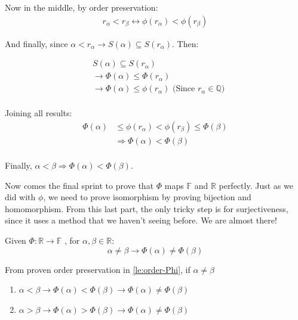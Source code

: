 \begin{bookproof}
Now in the middle, by order preservation:
\begin{align*}
r_\alpha < r_\beta \leftrightarrow \phi(r_\alpha) < \phi(r_\beta)
\end{align*}

And finally, since $\alpha < r_\alpha \rightarrow S(\alpha) \subseteq S(r_\alpha)$. Then:

\begin{align*}
&S(\alpha) \subseteq S(r_\alpha) \\
&\rightarrow \Phi(\alpha) \leq \Phi(r_\alpha) \\
&\rightarrow \Phi(\alpha) \leq \phi(r_\alpha) \text{ (Since $r_\alpha \in \mathbb{Q}$)} \\
\end{align*}

Joining all results:
\begin{align*}
\Phi(\alpha) &\leq \phi(r_\alpha) < \phi(r_\beta) \leq \Phi(\beta) \\
&\Rightarrow \Phi(\alpha) < \Phi(\beta) \\
\end{align*}

Finally, $\alpha < \beta \Rightarrow \Phi(\alpha) < \Phi(\beta)$.
\end{bookproof}

Now comes the final sprint to prove that $\Phi$ maps $\mathbb{F}$ and $\mathbb{R}$ perfectly. Just as we did with $\phi$, we need to prove isomorphism by proving bijection and homomorphism. From this last part, the only tricky step is for surjectiveness, since it uses a method that we haven't seeing before. We are almost there!

\begin{lemma}\label{le:Phi-injective}
Given $\Phi: \mathbb{R} \rightarrow \mathbb{F}$
, for $\alpha, \beta \in \mathbb{R}:$
$$\alpha \neq \beta \rightarrow \Phi(\alpha) \neq \Phi(\beta)$$
\end{lemma}

\begin{bookproof}
From proven order preservation in \cref{le:order-Phi}, if $\alpha \neq \beta$
\begin{enumerate}
\item $\alpha < \beta \rightarrow \Phi(\alpha) < \Phi(\beta) \rightarrow \Phi(\alpha) \neq \Phi(\beta)$
\item $\alpha > \beta \rightarrow \Phi(\alpha) > \Phi(\beta) \rightarrow \Phi(\alpha) \neq \Phi(\beta)$ 
\end{enumerate}
\end{bookproof}

